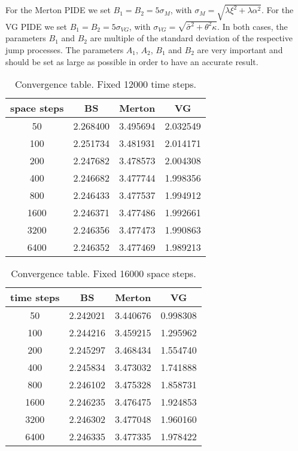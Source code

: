 For the Merton PIDE we set $B_1 = B_2 = 5\sigma_M$, with $\sigma_M = \sqrt{ \lambda \xi^2 + \lambda \alpha^2 }$. 
For the VG PIDE we set $ B_1 = B_2 = 5 \sigma_{VG}$, with $\sigma_{VG} = \sqrt{\bar\sigma^2 + \theta^2 \kappa}$. 
In both cases, the parameters $B_1$ and $B_2$ are multiple of the standard deviation of the respective jump processes.
The parameters $A_1$, $A_2$, $B_1$ and $B_2$ are very important and should be set as large as possible in order to have an accurate result.
\begin{table}[ht]
\centering
\begin{tabular}[t]{cccc}
\toprule
   \textbf{space steps}    &  \textbf{BS} &  \textbf{Merton}  & \textbf{VG} \\
\midrule
 50    & 2.268400  &  3.495694  &  2.032549  \\
 100   & 2.251734  &  3.481931  &  2.014171  \\
 200   & 2.247682  &  3.478573  &  2.004308  \\
 400   & 2.246682  &  3.477744  &  1.998356 \\ 
 800   & 2.246433  &  3.477537  &  1.994912 \\
 1600  & 2.246371  &  3.477486  &  1.992661 \\
 3200  & 2.246356  &  3.477473  &  1.990863 \\
 6400  & 2.246352  &  3.477469  &  1.989213 \\
\bottomrule
\end{tabular}
\caption{Convergence table. Fixed 12000 time steps. }
\label{tab:space_conv}
\end{table}%
\begin{table}[ht]
\centering
\begin{tabular}[t]{cccc}
\toprule
   \textbf{time steps}    &  \textbf{BS} &  \textbf{Merton}  & \textbf{VG} \\
\midrule
50     & 2.242021 & 3.440676 & 0.998308 \\
100    & 2.244216 & 3.459215 & 1.295962 \\
200    & 2.245297 & 3.468434 & 1.554740 \\
400    & 2.245834 & 3.473032 & 1.741888 \\
800    & 2.246102 & 3.475328 & 1.858731 \\
1600   & 2.246235 & 3.476475 & 1.924853 \\
3200   & 2.246302 & 3.477048 & 1.960160 \\
6400   & 2.246335 & 3.477335 & 1.978422 \\
\bottomrule
\end{tabular}
\caption{Convergence table. Fixed 16000 space steps. }
\label{tab:time_conv}
\end{table}%

